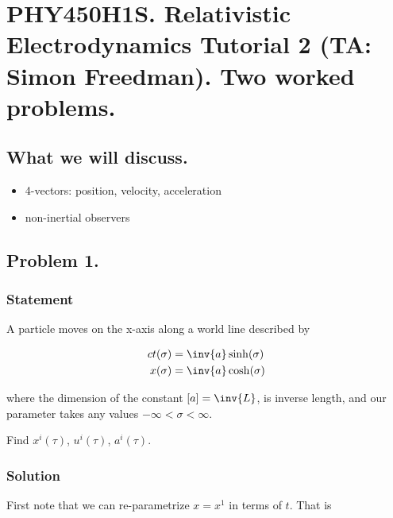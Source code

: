 
%

\chapter{PHY450H1S.  Relativistic Electrodynamics Tutorial 2 (TA: Simon Freedman).  Two worked problems.}
\label{chap:relativisticElectrodynamicsT2}
{}
\date{Jan 27, 2011}

\beginArtNoToc

\section{What we will discuss.}

\begin{itemize}
\item 4-vectors: position, velocity, acceleration
\item non-inertial observers
\end{itemize}

\section{Problem 1.}

\subsection{Statement}
A particle moves on the x-axis along a world line described by

\begin{align}\label{eqn:relativisticElectrodynamicsT2:10}
ct(\sigma) &= \inv{a} \sinh(\sigma) \\
x(\sigma) &= \inv{a} \cosh(\sigma)
\end{align}

where the dimension of the constant $[a] = \inv{L}$, is inverse length, and our parameter takes any values $-\infty < \sigma < \infty$.

Find $x^i(\tau)$, $u^i(\tau)$, $a^i(\tau)$.

\subsection{Solution}

First note that we can re-parametrize $x = x^1$ in terms of $t$.  That is

